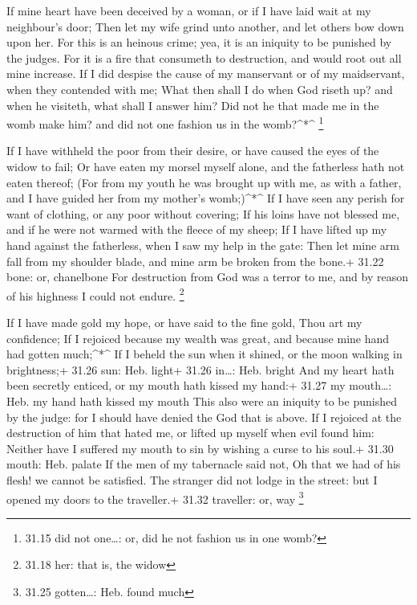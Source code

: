  If mine heart have been deceived by a woman, or if I have
laid wait at my neighbour's door;  Then let my wife grind
unto another, and let others bow down upon her.  For this
is an heinous crime; yea, it is an iniquity to be punished by the
judges.  For it is a fire that consumeth to destruction,
and would root out all mine increase.  If I did despise the
cause of my manservant or of my maidservant, when they contended with
me;  What then shall I do when God riseth up? and when he
visiteth, what shall I answer him?  Did not he that made me
in the womb make him? and did not one fashion us in the womb?\^{}*\^{}
\footnote{31.15 did not one\ldots: or, did he not fashion us in one
  womb?}

 If I have withheld the poor from their desire, or have
caused the eyes of the widow to fail;  Or have eaten my
morsel myself alone, and the fatherless hath not eaten thereof;
 (For from my youth he was brought up with me, as with a
father, and I have guided her from my mother's womb;)\^{}*\^{}
 If I have seen any perish for want of clothing, or any
poor without covering;  If his loins have not blessed me,
and if he were not warmed with the fleece of my sheep;  If
I have lifted up my hand against the fatherless, when I saw my help in
the gate:  Then let mine arm fall from my shoulder blade,
and mine arm be broken from the bone.+ 31.22 bone: or, chanelbone
 For destruction from God was a terror to me, and by reason
of his highness I could not endure. \footnote{31.18 her: that is, the
  widow}

 If I have made gold my hope, or have said to the fine
gold, Thou art my confidence;  If I rejoiced because my
wealth was great, and because mine hand had gotten much;\^{}*\^{}
 If I beheld the sun when it shined, or the moon walking in
brightness;+ 31.26 sun: Heb. light+ 31.26 in\ldots: Heb. bright
 And my heart hath been secretly enticed, or my mouth hath
kissed my hand:+ 31.27 my mouth\ldots: Heb. my hand hath kissed my mouth
 This also were an iniquity to be punished by the judge:
for I should have denied the God that is above.  If I
rejoiced at the destruction of him that hated me, or lifted up myself
when evil found him:  Neither have I suffered my mouth to
sin by wishing a curse to his soul.+ 31.30 mouth: Heb. palate
 If the men of my tabernacle said not, Oh that we had of
his flesh! we cannot be satisfied.  The stranger did not
lodge in the street: but I opened my doors to the traveller.+ 31.32
traveller: or, way \footnote{31.25 gotten\ldots: Heb. found much}

